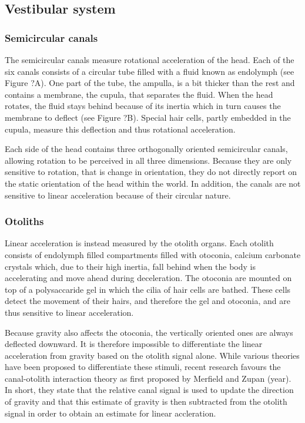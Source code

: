 \subsection{Vestibular system}

\subsubsection{Semicircular canals}
The semicircular canals measure rotational acceleration of the head. Each of the six  canals consists of a circular tube filled with a fluid known as endolymph (see Figure ?A). One part of the tube, the ampulla, is a bit thicker than the rest and contains a membrane, the cupula, that separates the fluid. When the head rotates, the fluid stays behind because of its inertia which in turn causes the membrane to deflect (see Figure ?B). Special hair cells, partly embedded in the cupula, measure this deflection and thus rotational acceleration. 

Each side of the head contains three orthogonally oriented semicircular canals, allowing rotation to be perceived in all three dimensions. Because they are only sensitive to rotation, that is change in orientation, they do not directly report on the static orientation of the head within the world. In addition, the canals are not sensitive to linear acceleration because of their circular nature.

\subsubsection{Otoliths}
Linear acceleration is instead measured by the otolith organs. Each otolith consists of endolymph filled compartments filled with otoconia, calcium carbonate crystals which, due to their high inertia, fall behind when the body is accelerating and move ahead during deceleration. The otoconia are mounted on top of a polysaccaride gel in which the cilia of hair cells are bathed. These cells detect the movement of their hairs, and therefore the gel and otoconia, and are thus sensitive to linear acceleration.

Because gravity also affects the otoconia, the vertically oriented ones are always deflected downward. It is therefore impossible to differentiate the linear acceleration from gravity based on the otolith signal alone. While various theories have been proposed to differentiate these stimuli, recent research favours the canal-otolith interaction theory as first proposed by Merfield and Zupan (year). In short, they state that the relative canal signal is used to update the direction of gravity and that this estimate of gravity is then subtracted from the otolith signal in order to obtain an estimate for linear accleration.

